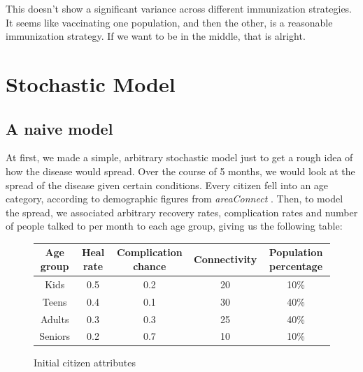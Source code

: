 \documentclass[titlepage]{article}
\begin{document}
This doesn't show a significant variance across different immunization strategies.
It seems like vaccinating one population, and then the other, is a reasonable
	immunization strategy.
If we want to be in the middle, that is alright.


\section{Stochastic Model}
\subsection{A naive model}
\par At first, we made a simple, arbitrary stochastic model just to get a rough idea of how the disease would spread. Over the course of 5 months, we would look at the spread of the disease given certain conditions. Every citizen fell into an age category, according to demographic figures from \emph{areaConnect} \cite{areconnect}. Then, to model the spread, we associated arbitrary recovery rates, complication rates and number of people talked to per month to each age group, giving us the following table:
\begin{figure}[h!]
\centering
\begin{tabular}{c|c|c|c|c}
Age group & Heal rate & Complication chance & Connectivity & Population percentage\\ \hline
Kids & 0.5 & 0.2 & 20 & 10\%\\
Teens & 0.4 & 0.1 & 30 & 40\%\\
Adults & 0.3 & 0.3 & 25 & 40\%\\
Seniors & 0.2 & 0.7 & 10 & 10\%
\end{tabular}
\caption{Initial citizen attributes}
\end{figure}
\end{document}
